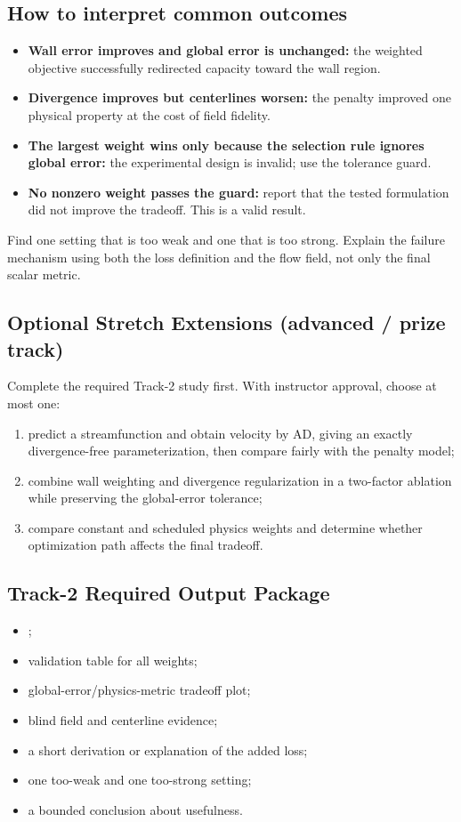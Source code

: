 \documentclass[11pt]{article}
\newcommand{\file}[1]{\path{#1}}
\begin{document}
\subsection{How to interpret common outcomes}
\begin{itemize}
\item \textbf{Wall error improves and global error is unchanged:} the weighted objective successfully redirected capacity toward the wall region.
\item \textbf{Divergence improves but centerlines worsen:} the penalty improved one physical property at the cost of field fidelity.
\item \textbf{The largest weight wins only because the selection rule ignores global error:} the experimental design is invalid; use the tolerance guard.
\item \textbf{No nonzero weight passes the guard:} report that the tested formulation did not improve the tradeoff. This is a valid result.
\end{itemize}

\begin{failurebox}
Find one setting that is too weak and one that is too strong. Explain the failure mechanism using both the loss definition and the flow field, not only the final scalar metric.
\end{failurebox}

\subsection{Optional Stretch Extensions (advanced / prize track)}
Complete the required Track-2 study first. With instructor approval, choose at most one:
\begin{enumerate}
\item predict a streamfunction and obtain velocity by AD, giving an exactly divergence-free parameterization, then compare fairly with the penalty model;
\item combine wall weighting and divergence regularization in a two-factor ablation while preserving the global-error tolerance;
\item compare constant and scheduled physics weights and determine whether optimization path affects the final tradeoff.
\end{enumerate}

\subsection{Track-2 Required Output Package}
\begin{itemize}
\item \file{P2_results.csv};
\item validation table for all weights;
\item global-error/physics-metric tradeoff plot;
\item blind field and centerline evidence;
\item a short derivation or explanation of the added loss;
\item one too-weak and one too-strong setting;
\item a bounded conclusion about usefulness.
\end{itemize}
\end{document}

